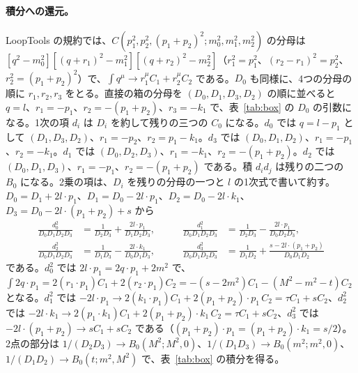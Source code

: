 \documentclass[a4paper,10pt]{ltjsarticle}
\begin{document}
\paragraph{積分への還元。}LoopTools の規約では、$C(p_1^2,p_2^2,(p_1+p_2)^2;m_0^2,m_1^2,m_2^2)$ の分母は $[q^2-m_0^2][(q+r_1)^2-m_1^2][(q+r_2)^2-m_2^2]$（$r_1^2=p_1^2$、$(r_2-r_1)^2=p_2^2$、$r_2^2=(p_1+p_2)^2$）で、$\int q^\mu\to r_1^\mu C_1+r_2^\mu C_2$ である。$D_0$ も同様に、4つの分母の順に $r_1,r_2,r_3$ をとる。直接の箱の分母を $(D_0,D_1,D_3,D_2)$ の順に並べると $q=l$、$r_1=-p_1$、$r_2=-(p_1+p_2)$、$r_3=-k_1$ で、表~\ref{tab:box} の $D_0$ の引数になる。1次の項 $d_i$ は $D_i$ を約して残りの三つの $C_0$ になる。$d_0$ では $q=l-p_1$ として $(D_1,D_3,D_2)$、$r_1=-p_2$、$r_2=p_1-k_1$。$d_3$ では $(D_0,D_1,D_2)$、$r_1=-p_1$、$r_2=-k_1$。$d_1$ では $(D_0,D_2,D_3)$、$r_1=-k_1$、$r_2=-(p_1+p_2)$。$d_2$ では $(D_0,D_1,D_3)$、$r_1=-p_1$、$r_2=-(p_1+p_2)$ である。積 $d_id_j$ は残りの二つの $B_0$ になる。2乗の項は、$D_i$ を残りの分母の一つと $l$ の1次式で書いて約す。$D_0=D_1+2l\cdot p_1$、$D_1=D_0-2l\cdot p_1$、$D_2=D_0-2l\cdot k_1$、$D_3=D_0-2l\cdot(p_1+p_2)+s$ から
\begin{equation*}
\begin{aligned}
\frac{d_0^2}{D_0D_1D_2D_3}&=\frac{1}{D_2D_3}+\frac{2l\cdot p_1}{D_1D_2D_3},&\qquad
\frac{d_1^2}{D_0D_1D_2D_3}&=\frac{1}{D_2D_3}-\frac{2l\cdot p_1}{D_0D_2D_3},\\
\frac{d_2^2}{D_0D_1D_2D_3}&=\frac{1}{D_1D_3}-\frac{2l\cdot k_1}{D_0D_1D_3},&\qquad
\frac{d_3^2}{D_0D_1D_2D_3}&=\frac{1}{D_1D_2}+\frac{s-2l\cdot(p_1+p_2)}{D_0D_1D_2}
\end{aligned}
\end{equation*}
である。$d_0^2$ では $2l\cdot p_1=2q\cdot p_1+2m^2$ で、$\int2q\cdot p_1=2(r_1\cdot p_1)C_1+2(r_2\cdot p_1)C_2=-(s-2m^2)C_1-(M^2-m^2-t)C_2$ となる。$d_1^2$ では $-2l\cdot p_1\to2(k_1\cdot p_1)C_1+2(p_1+p_2)\cdot p_1\,C_2=\tau C_1+sC_2$、$d_2^2$ では $-2l\cdot k_1\to2(p_1\cdot k_1)C_1+2(p_1+p_2)\cdot k_1\,C_2=\tau C_1+sC_2$、$d_3^2$ では $-2l\cdot(p_1+p_2)\to sC_1+sC_2$ である（$(p_1+p_2)\cdot p_1=(p_1+p_2)\cdot k_1=s/2$）。2点の部分は $1/(D_2D_3)\to B_0(M^2;M^2,0)$、$1/(D_1D_3)\to B_0(m^2;m^2,0)$、$1/(D_1D_2)\to B_0(t;m^2,M^2)$ で、表~\ref{tab:box} の積分を得る。
\end{document}
